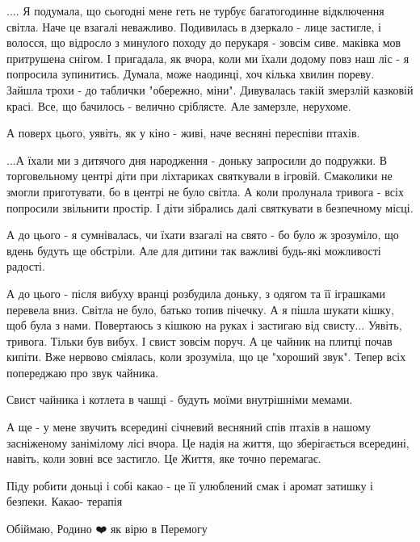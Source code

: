 .... Я подумала, що сьогодні мене геть не турбує багатогодинне відключення
світла. Наче це взагалі неважливо. Подивилась в дзеркало - лице застигле, і
волосся, що відросло з минулого походу до перукаря - зовсім сиве. маківка мов
притрушена снігом. І пригадала, як вчора, коли ми їхали додому повз наш ліс - я
попросила зупинитись. Думала, може наодинці, хоч кілька хвилин пореву. Зайшла
трохи - до таблички "обережно, міни". Дивувалась такій змерзлій казковій красі.
Все, що бачилось - велично сріблясте. Але замерзле, нерухоме.

А поверх цього, уявіть, як у кіно - живі, наче весняні переспіви птахів.

...А їхали ми з дитячого дня народження - доньку запросили до подружки. В
торговельному центрі діти при ліхтариках святкували в ігровій. Смаколики не
змогли приготувати, бо в центрі не було світла. А коли пролунала тривога - всіх
попросили звільнити простір. І діти зібрались далі святкувати в безпечному
місці.

А до цього - я сумнівалась, чи їхати взагалі на свято - бо було ж зрозуміло, що
вдень будуть ще обстріли. Але для дитини так важливі будь-які можливості
радості.

А до цього - після вибуху вранці розбудила доньку, з одягом та її іграшками
перевела вниз. Світла не було, батько топив пічечку. А я пішла шукати кішку,
щоб була з нами. Повертаюсь з кішкою на руках і застигаю від свисту... Уявіть,
тривога. Тільки був вибух. І свист зовсім поруч. А це чайник на плитці почав
кипіти. Вже нервово сміялась, коли зрозуміла, що це "хороший звук". Тепер всіх
попереджаю про звук чайника. 

Свист чайника і котлета в чашці - будуть моїми внутрішніми мемами. 🙂

А ще - у мене звучить всередині січневий весняний спів птахів в нашому
засніженому занімілому лісі вчора.  Це надія на життя, що зберігається
всередині, навіть, коли зовні все застигло. Це Життя, яке точно перемагає. 

Піду робити доньці і собі какао - це її улюблений смак і аромат затишку і
безпеки. Какао- терапія 

Обіймаю, Родино ❤️ як вірю в Перемогу
